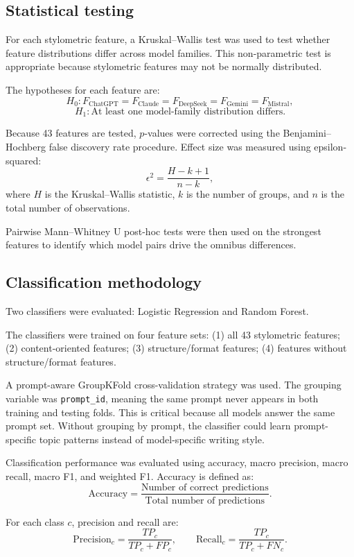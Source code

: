 \subsection{Statistical testing}
For each stylometric feature, a Kruskal--Wallis test was used to test whether feature distributions differ across model families. This non-parametric test is appropriate because stylometric features may not be normally distributed.

The hypotheses for each feature are:
\[
H_0: F_{\text{ChatGPT}} = F_{\text{Claude}} = F_{\text{DeepSeek}} = F_{\text{Gemini}} = F_{\text{Mistral}},
\]
\[
H_1: \text{At least one model-family distribution differs.}
\]

Because 43 features are tested, $p$-values were corrected using the Benjamini--Hochberg false discovery rate procedure. Effect size was measured using epsilon-squared:
\[
\epsilon^2 = \frac{H-k+1}{n-k},
\]
where $H$ is the Kruskal--Wallis statistic, $k$ is the number of groups, and $n$ is the total number of observations.

Pairwise Mann--Whitney U post-hoc tests were then used on the strongest features to identify which model pairs drive the omnibus differences.

\subsection{Classification methodology}
Two classifiers were evaluated: Logistic Regression and Random Forest.

The classifiers were trained on four feature sets: (1) all 43 stylometric features; (2) content-oriented features; (3) structure/format features; (4) features without structure/format features.

A prompt-aware GroupKFold cross-validation strategy was used. The grouping variable was \texttt{prompt\_id}, meaning the same prompt never appears in both training and testing folds. This is critical because all models answer the same prompt set. Without grouping by prompt, the classifier could learn prompt-specific topic patterns instead of model-specific writing style.

Classification performance was evaluated using accuracy, macro precision, macro recall, macro F1, and weighted F1. Accuracy is defined as:
\[
\text{Accuracy} = \frac{\text{Number of correct predictions}}{\text{Total number of predictions}}.
\]

For each class $c$, precision and recall are:
\[
\text{Precision}_c = \frac{TP_c}{TP_c + FP_c},
\qquad
\text{Recall}_c = \frac{TP_c}{TP_c + FN_c}.
\]


